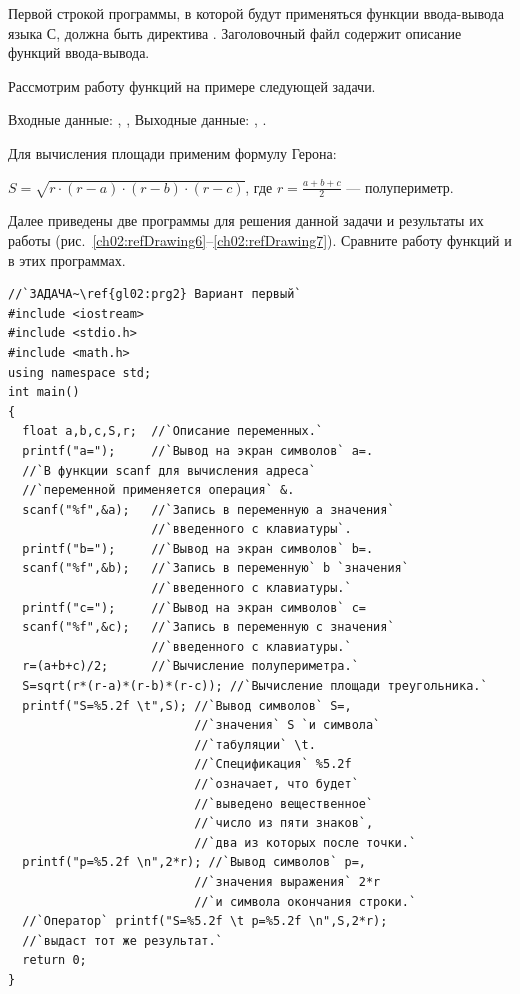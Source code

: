 Первой строкой программы, в которой будут применяться функции ввода-вывода языка С, должна быть директива
. Заголовочный файл  содержит
описание функций ввода-вывода. 

Рассмотрим работу функций на примере следующей задачи.


Входные данные: , ,  Выходные данные:
, . 

Для вычисления площади применим формулу Герона:

$S=\sqrt{r\cdot (r-a)\cdot (r-b)\cdot (r-c)}$, где $r=\frac{a+b+c}{2}$ --- полупериметр.

Далее приведены две программы для решения данной задачи и результаты их работы 
(рис.~\ref{ch02:refDrawing6}--\ref{ch02:refDrawing7}).
Сравните работу функций  и  в этих программах.
\begin{lstlisting}
//`ЗАДАЧА~\ref{gl02:prg2} Вариант первый`
#include <iostream>
#include <stdio.h>
#include <math.h>
using namespace std;
int main()
{
  float a,b,c,S,r;  //`Описание переменных.`
  printf("a=");	    //`Вывод на экран символов` a=.
  //`В функции scanf для вычисления адреса`
  //`переменной применяется операция` &.
  scanf("%f",&a);   //`Запись в переменную а значения`
                    //`введенного с клавиатуры`.
  printf("b=");     //`Вывод на экран символов` b=.
  scanf("%f",&b);   //`Запись в переменную` b `значения`
                    //`введенного с клавиатуры.`
  printf("c=");     //`Вывод на экран символов` c=
  scanf("%f",&c);   //`Запись в переменную c значения`
                    //`введенного с клавиатуры.`
  r=(a+b+c)/2;      //`Вычисление полупериметра.`
  S=sqrt(r*(r-a)*(r-b)*(r-c)); //`Вычисление площади треугольника.`
  printf("S=%5.2f \t",S); //`Вывод символов` S=, 
                          //`значения` S `и символа`
                          //`табуляции` \t.
                          //`Спецификация` %5.2f
                          //`означает, что будет` 
                          //`выведено вещественное` 
                          //`число из пяти знаков`,
                          //`два из которых после точки.`
  printf("p=%5.2f \n",2*r); //`Вывод символов` p=,
                          //`значения выражения` 2*r
                          //`и символа окончания строки.`
  //`Оператор` printf("S=%5.2f \t p=%5.2f \n",S,2*r);
  //`выдаст тот же результат.`
  return 0;
}
\end{lstlisting}

